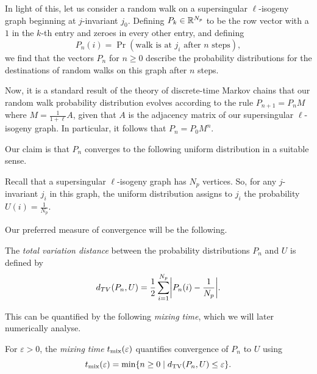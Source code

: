         In light of this, let us consider a random walk on a supersingular $\ell$-isogeny graph beginning at $j$-invariant $j_0$. Defining $P_k \in \mathbb{R}^{N_p}$ to be the row vector with a $1$ in the $k$-th entry and zeroes in every other entry, and defining
        \begin{equation*}
            P_n(i) = \Pr(\text{walk is at } j_i \text{ after } n \text{ steps}),
        \end{equation*}
        we find that the vectors $P_n$ for $n \geq 0$ describe the probability distributions for the destinations of random walks on this graph after $n$ steps. 
        
        Now, it is a standard result of the theory of discrete-time Markov chains that our random walk probability distribution evolves according to the rule $P_{n+1} = P_n M$ where $M = \frac{1}{1 + \ell}A$, given that $A$ is the adjacency matrix of our supersingular $\ell$-isogeny graph. In particular, it follows that $P_n = P_0 M^n$.
        
        Our claim is that $P_n$ converges to the following uniform distribution in a suitable sense.
        
        \begin{definition}
            Recall that a supersingular $\ell$-isogeny graph has $N_p$ vertices. So, for any $j$-invariant $j_i$ in this graph, the uniform distribution assigns to $j_i$ the probability $U(i) = \frac{1}{N_p}$.
        \end{definition}

        Our preferred measure of convergence will be the following.
        \begin{definition}
            The \textit{total variation distance} between the probability distributions $P_n$ and $U$ is defined by
            \begin{equation*}
                d_{TV}(P_n, U) = \frac{1}{2}\sum_{i=1}^{N_p} \abs{P_n(i) - \frac{1}{N_p}}.
            \end{equation*}
        \end{definition}
        This can be quantified by the following \textit{mixing time}, which we will later numerically analyse.
        \begin{definition}
            For $\varepsilon > 0$, the \textit{mixing time} $t_{\operatorname{mix}}(\varepsilon)$ quantifies convergence of $P_n$ to $U$ using
            \begin{equation*}
                t_{\mix}(\varepsilon) = \min\curly{n \geq 0 \mid d_{\TV}(P_n, U) \leq \varepsilon}.
            \end{equation*}
        \end{definition}
        